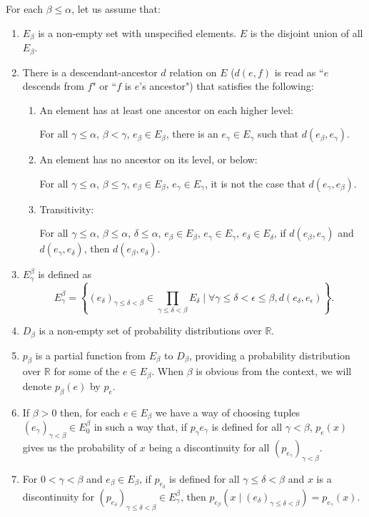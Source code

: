 \documentclass[a4paper
,draft
]{article}
\def\reale{\mathbb{R}}
\newcommand{\multime}[1]{\left\{ #1 \right\}}
\newcommand{\ghilimele}[1]{``#1"}
\begin{document}
For each $\beta\le\alpha$, let us assume that:
\begin{enumerate}
  \item $E_\beta$ is a non-empty set with unspecified elements.
        $E$ is the disjoint union of
        all $E_\beta$.
  \item There is a descendant-ancestor $d$ relation on $E$ ($d(e, f)$ is read as
        \ghilimele{$e$ descends from $f$} or \ghilimele{$f$ is $e$'s ancestor})
        that satisfies the following:
        \begin{enumerate}
          \item An element has at least one ancestor on each higher level:

                For all $\gamma\le\alpha$, $\beta<\gamma$,
                $e_\beta\in E_\beta$,
                there is an $e_\gamma\in E_\gamma$ such that
                $d(e_\beta, e_\gamma)$.
          \item An element has no ancestor on its level, or below:

                For all $\gamma\le\alpha$, $\beta\le\gamma$,
                $e_\beta\in E_\beta$,
                $e_\gamma\in E_\gamma$, it is not the case that
                $d(e_\gamma, e_\beta)$.
          \item Transitivity:

                For all $\gamma\le\alpha$, $\beta\le\alpha$, $\delta\le\alpha$,
                $e_\beta\in E_\beta$, $e_\gamma\in E_\gamma$,
                $e_\delta\in E_\delta$, if $d(e_\beta, e_\gamma)$ and
                $d(e_\gamma, e_\delta)$, then $d(e_\beta, e_\delta)$.
        \end{enumerate}
  \item $E^\beta_\gamma$ is defined as
        $$E^\beta_\gamma=\multime{
          (e_\delta)_{\gamma\le \delta < \beta}
            \in\prod_{\gamma\le \delta < \beta}E_\delta
          \mid
          \forall \gamma\le\delta<\epsilon\le\beta, d(e_\delta, e_\epsilon)}.$$
  \item $D_\beta$ is a non-empty set of probability distributions over $\reale$.
  \item $p_\beta$ is a partial function from $E_\beta$ to $D_\beta$, providing
        a probability distribution over $\reale$ for some of the $e\in E_\beta$.
        When $\beta$ is obvious from the context, we will denote $p_\beta(e)$
        by $p_e$.
  \item If $\beta > 0$ then, for each $e\in E_\beta$ we have a way of choosing
        tuples $(e_\gamma)_{\gamma<\beta}\in E^\beta_0$ in such a way that,
        if $p_\gamma{e_\gamma}$ is defined for all $\gamma<\beta$,
        $p_e(x)$ gives us the probability of $x$ being a discontinuity for
        all $(p_{e_\gamma})_{\gamma<\beta}$.
  \item For $0 < \gamma < \beta$ and $e_\beta\in E_\beta$, if
        $p_{e_\delta}$ is defined for all $\gamma\le\delta<\beta$ and $x$ is a
        discontinuity for
        $(p_{e_\delta})_{\gamma\le\delta<\beta}\in E^\beta_\gamma$, then
        $p_{e_\beta}(x \mid (e_\delta)_{\gamma\le\delta<\beta})
          = p_{e_\gamma}(x)$.
\end{enumerate}
\end{document}

